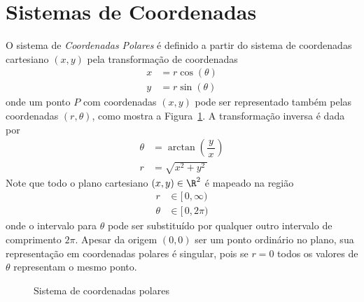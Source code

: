 \section{Sistemas de Coordenadas}
\label{sec:sistemas_coorenadas}

O sistema de \emph{Coordenadas Polares}
é definido a partir do sistema de coordenadas cartesiano $(x, y)$
pela transformação de coordenadas
\begin{equation}
  \label{eq:coordenadas_polares}
  \begin{split}
    x & = r \cos(\theta) \\
    y & = r \sin(\theta)
  \end{split}
\end{equation}
onde um ponto $P$ com coordenadas $(x, y)$ pode ser representado também
pelas coordenadas $(r, \theta)$, como mostra a Figura~\ref{fig:coordenadas_polares}.
A transformação inversa é dada por
\begin{equation}
  \label{eq:coordenadas_polares_inversa}
  \begin{split}
    \theta & = \arctan\left(\dfrac{\,y\,}{x}\right) \\[3mm]
    r      & = \sqrt{x^2 + y^2\,}
  \end{split}
\end{equation}
Note que todo o plano cartesiano $(x, y)\in\R^2$ é mapeado na região
\[
  \begin{split}
    r      & \in [\,0, \infty) \\
    \theta & \in [\,0, 2\pi)
  \end{split}
\]
onde o intervalo para $\theta$ pode ser substituído por qualquer outro
intervalo de comprimento $2\pi$.
Apesar da origem $(0, 0)$ ser um ponto ordinário no plano, sua representação
em coordenadas polares é singular, pois se $r=0$ todos os valores de $\theta$
representam o mesmo ponto.

\begin{figure}
  \centering
  
  \caption{Sistema de coordenadas polares}
  \label{fig:coordenadas_polares}
\end{figure}

